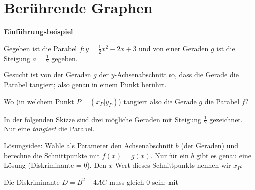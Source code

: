 \section{Berührende Graphen}

\textbf{Einführungsbeispiel}


Gegeben ist die Parabel $f: y=\frac{1}{2}x^2 -2x +3$ und von einer
Geraden $g$ ist die Steigung $a =\frac12$ gegeben.

Gesucht ist von der Geraden $g$ der $y$-Achsenabschnitt so, dass die
Gerade die Parabel tangiert; also genau in einem Punkt berührt.

Wo (in welchem Punkt $P=(x_P|y_P)$) tangiert also die Gerade $g$ die Parabel $f$?

In der folgenden Skizze sind drei mögliche Geraden mit Steigung
$\frac{1}{2}$ gezeichnet. Nur eine \textit{tangiert} die Parabel.


Lösungsidee: Wähle als Parameter den Achsenabschnitt $b$ (der Geraden)
und berechne die Schnittpunkte mit $f(x) = g(x)$. Nur für ein $b$ gibt
es genau eine Lösung (Diskriminante = 0). Den $x$-Wert dieses
Schnittpunkts nennen wir $x_P$:

\newpage

Die Diskriminante $D=B^2 - 4AC$ muss gleich 0 sein; mit

  
